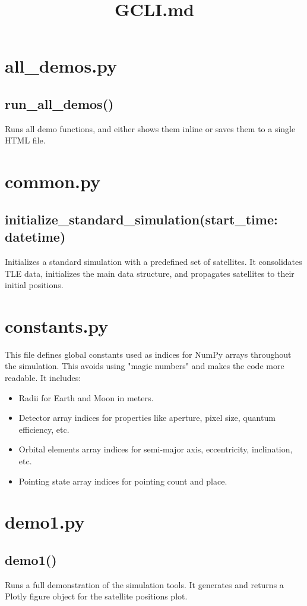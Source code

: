 \documentclass{article}
\title{GCLI.md}
\author{}
\date{}
\begin{document}
\maketitle
\section*{all\_demos.py}
\subsection*{run\_all\_demos()}
Runs all demo functions, and either shows them inline or saves them to a single HTML file.

\section*{common.py}
\subsection*{initialize\_standard\_simulation(start\_time: datetime)}
Initializes a standard simulation with a predefined set of satellites. It consolidates TLE data, initializes the main data structure, and propagates satellites to their initial positions.

\section*{constants.py}
This file defines global constants used as indices for NumPy arrays throughout the simulation. This avoids using "magic numbers" and makes the code more readable. It includes:
\begin{itemize}
\item Radii for Earth and Moon in meters.
\item Detector array indices for properties like aperture, pixel size, quantum efficiency, etc.
\item Orbital elements array indices for semi-major axis, eccentricity, inclination, etc.
\item Pointing state array indices for pointing count and place.
\end{itemize}

\section*{demo1.py}
\subsection*{demo1()}
Runs a full demonstration of the simulation tools. It generates and returns a Plotly figure object for the satellite positions plot.
\end{document}
